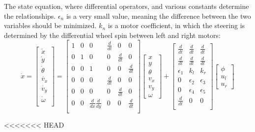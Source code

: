 \noindent The state equation, where differential operators, and various constants determine the relationships. $\epsilon_n$ is a very small value, meaning the difference between the two variables should be minimized. $k_n$ is a motor coefficient, in which the steering is determined by the differential wheel spin between left and right motors:
\[\dot{x} =
\begin{bmatrix}
	\dot{x}\\ \dot{y}\\ \dot{\theta}\\ \dot{v_x}\\ \dot{v_y}\\ \dot{\omega}\\
\end{bmatrix} = 
\begin{bmatrix}
	1 & 0 & 0 & \frac{d}{dt} & 0 & 0 \\
	0 & 1 & 0 & 0 & \frac{d}{dt} & 0 \\
	0 & 0 & 1 & 0 & 0 & \frac{d}{dt} \\
	0 & 0 & 0 & \frac{d}{dt} & 0 & 0 \\
	0 & 0 & 0 & 0 & \frac{d}{dt} & 0 \\
	0 & 0 & \frac{d}{dx}\frac{d}{dy} & 0 & 0 & \frac{d}{dt} \\
\end{bmatrix}
\begin{bmatrix}
	x\\ y\\ \theta\\ v_x\\ v_y\\ \omega
\end{bmatrix} + 
\begin{bmatrix}
	\frac{d}{dt} & \frac{d}{dt} & \frac{d}{dt} \\
	\frac{d}{dt} & \frac{d}{dt} & \frac{d}{dt} \\
	\epsilon_1 & k_l & k_r \\
	0 & \epsilon_2 & \epsilon_3 \\
	0 & \epsilon_4 & \epsilon_5 \\
	\frac{d}{dt} & 0 & 0\\
\end{bmatrix}
\begin{bmatrix}
	\phi\\ u_l\\ u_r
\end{bmatrix}
\]

<<<<<<< HEAD

